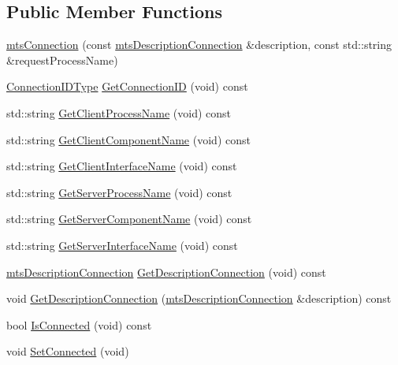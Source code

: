 \subsection*{Public Member Functions}
\begin{DoxyCompactItemize}
\item 
\hyperlink{classmts_connection_a071972ee336069bba608bd6737251c80}{mts\+Connection} (const \hyperlink{classmts_description_connection}{mts\+Description\+Connection} \&description, const std\+::string \&request\+Process\+Name)
\item 
\hyperlink{mts_forward_declarations_8h_ad3543bb11742e1766374ec96016d6547}{Connection\+I\+D\+Type} \hyperlink{classmts_connection_a0cdb99db04bf430b6d66d101a06632e7}{Get\+Connection\+I\+D} (void) const 
\item 
std\+::string \hyperlink{classmts_connection_a863c48dc7afc08a3cf46daa8baefc71d}{Get\+Client\+Process\+Name} (void) const 
\item 
std\+::string \hyperlink{classmts_connection_a3121c2b3b8b866c02061f1933cb6dbb3}{Get\+Client\+Component\+Name} (void) const 
\item 
std\+::string \hyperlink{classmts_connection_a9e646b120e7922e1cc541b3cd76f8cdc}{Get\+Client\+Interface\+Name} (void) const 
\item 
std\+::string \hyperlink{classmts_connection_a7238662b0ee1b16715b154bdc3e7d2b1}{Get\+Server\+Process\+Name} (void) const 
\item 
std\+::string \hyperlink{classmts_connection_a5840d98170336716c9e12b0790807b01}{Get\+Server\+Component\+Name} (void) const 
\item 
std\+::string \hyperlink{classmts_connection_a846f0404697261cd08493abbd9fe0b23}{Get\+Server\+Interface\+Name} (void) const 
\item 
\hyperlink{classmts_description_connection}{mts\+Description\+Connection} \hyperlink{classmts_connection_a57ce93d13a639abfde415fce5aea3b4f}{Get\+Description\+Connection} (void) const 
\item 
void \hyperlink{classmts_connection_a8cf4f6f7a4fb474edb6a853d9365d751}{Get\+Description\+Connection} (\hyperlink{classmts_description_connection}{mts\+Description\+Connection} \&description) const 
\item 
bool \hyperlink{classmts_connection_ae9b6fd039a212ad72e7ccfd4a290cf25}{Is\+Connected} (void) const 
\item 
void \hyperlink{classmts_connection_ab6500a009f3f07c65be009eb7b6acd2f}{Set\+Connected} (void)
\item 

\end{DoxyCompactItemize}
